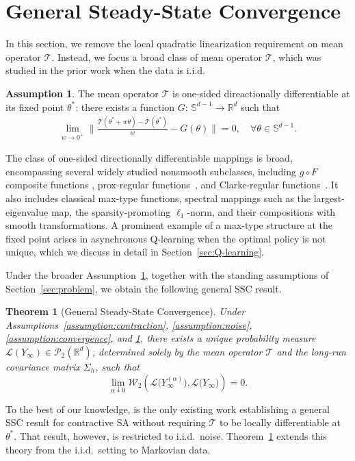 \documentclass[11pt,letterpaper]{article}
\theoremstyle{plain}
\newtheorem{theorem}{Theorem}
\theoremstyle{definition}
\newtheorem{assumption}{Assumption}
\theoremstyle{remark}
\newcommand{\mT}{\mathcal{T}}
\newcommand{\R}{\mathbb{R}}
\newcommand{\W}{\mathcal{W}}
\newcommand{\law}{\mathcal{L}}
\begin{document}
\section{General Steady-State Convergence}\label{sec:nondifferentiable}
In this section, we remove the local quadratic linearization requirement on mean operator $\mT$. Instead, we focus a broad class of mean operator $\mT$, which was studied in the prior work \cite{zhang2024prelimit} when the data is i.i.d.
\begin{assumption}\label{assumption:one-side}
The mean operator $\mT$ is one-sided direactionally differentiable at its fixed point $\theta^*$: there exists a function $G$: $\mathbb{S}^{d-1}\to \R^d$ such that
\begin{align*}
    \lim_{w \to 0^+} \Big\|\frac{\mT(\theta^* + w\theta)-\mT( \theta^*)}{w} - G(\theta)\Big\| = 0, \quad \forall \theta \in \mathbb{S}^{d-1}.
\end{align*}
\end{assumption}
The class of one-sided directionally differentiable mappings is broad,
encompassing several widely studied nonsmooth subclasses, including
\(g\circ F\) composite functions
\citep{shapiro2003class,sagastizabal2013composite},
prox-regular functions~\citep{poliquin1996prox}, and Clarke-regular
functions~\citep{clarke1990optimization,hiriart2004fundamentals}.
It also includes classical max-type functions, spectral mappings such as the
largest-eigenvalue map, the sparsity-promoting \(\ell_1\)-norm, and their
compositions with smooth transformations. A prominent example of a max-type structure at the fixed point arises in
asynchronous Q-learning when the optimal policy is not unique, which we
discuss in detail in Section~\ref{sec:Q-learning}.


Under the broader Assumption~\ref{assumption:one-side}, together with the
standing assumptions of Section~\ref{sec:problem}, we obtain the following
general SSC result.

\begin{theorem}[General Steady-State Convergence]
\label{thm:general-ssc}
Under Assumptions~\ref{assumption:contraction},
\ref{assumption:noise}, \ref{assumption:convergence}, and
\ref{assumption:one-side}, there exists a unique probability measure
\(\law(Y_\infty)\in\mathcal P_2(\R^d)\), determined solely by the mean operator
\(\mT\) and the long-run covariance matrix \(\Sigma_h\), such that
\[
    \lim_{\alpha \downarrow 0}
    \W_2\left(
        \law\bigl(Y_\infty^{(\alpha)}\bigr),
        \law\bigl(Y_\infty\bigr)
    \right)
    =
    0.
\]
\end{theorem}
To the best of our knowledge, \cite{zhang2024prelimit} is the only existing
work establishing a general SSC result for contractive SA without requiring
 \(\mT\) to be locally differentiable at \(\theta^*\).
That result, however, is restricted to i.i.d.\  noise.
Theorem~\ref{thm:general-ssc} extends this theory from the i.i.d.\ setting to
Markovian data.
\end{document}
